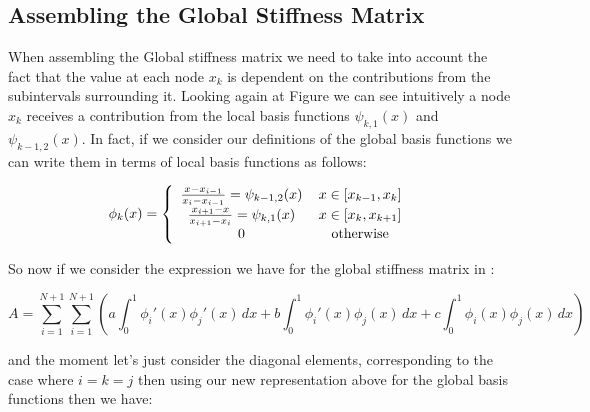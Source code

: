 \subsection{Assembling the Global Stiffness Matrix}


When assembling the Global stiffness matrix we need to take into account the
fact that the value at each node $x_k$ is dependent on the contributions from
the subintervals surrounding it. Looking again at Figure
 we can see intuitively a node $x_k$ receives a
contribution from the local basis functions $\psi_{k,1}(x)$ and
$\psi_{{k-1},2}(x)$. In fact, if we consider our definitions of the global
basis functions  we can write them in terms of local
basis functions as follows:

\begin{equation}\label{eq:oned-deterministic-local-global-basis}
    \phi_k(x) = \left\{\begin{array}{c c}
                    \frac{x - x_{i-1}}{x_i - x_{i-1}} = \psi_{{k-1},2}(x)\, & x \in [x_{k-1}, x_k] \\
                    \frac{x_{i+1} - x}{x_{i+1} - x_i} = \psi_{k, 1}(x)\, & x \in [x_k, x_{k+1}] \\
                    0\, & \text{otherwise}
             \end{array}\right.
\end{equation}

So now if we consider the expression we have for the global stiffness matrix in
:

\[
  A  = \sum_{i=1}^{N+1}\sum_{i=1}^{N+1}\left(a\int_0^1\phi_i'(x)\phi_j'(x)\, dx
                                           + b\int_0^1\phi_i'(x)\phi_j(x)\, dx
                                           + c\int_0^1\phi_i(x)\phi_j(x)\, dx\right)
\]

and the moment let's just consider the diagonal elements, corresponding to the
case where $i = k = j$ then using our new representation above for the global
basis functions then we have:

